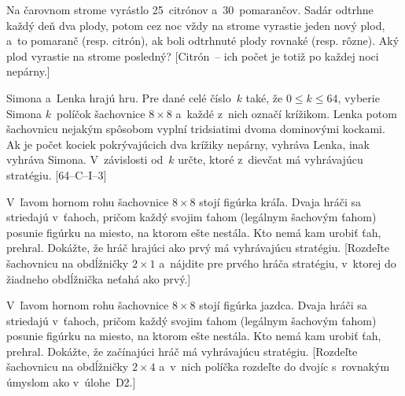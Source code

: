 {Na čarovnom strome vyrástlo 25~citrónov a~30~pomarančov. Sadár odtrhne každý
deň dva plody, potom cez noc vždy na strome vyrastie jeden nový plod,
a~to pomaranč (resp. citrón), ak boli odtrhnuté plody rovnaké (resp. rôzne).
Aký plod vyrastie na strome posledný? [Citrón~-- ich počet je
totiž po každej noci nepárny.]

\D
Simona a~Lenka hrajú hru. Pre dané celé číslo~$k$ také, že $0 \le
k\le 64$, vyberie Simona $k$~políčok šachovnice $8\times 8$ a~každé
z~nich označí krížikom. Lenka potom šachovnicu nejakým spôsobom vyplní
tridsiatimi dvoma dominovými kockami. Ak je počet kociek pokrývajúcich dva
krížiky nepárny, vyhráva Lenka, inak vyhráva Simona. V~závislosti od~$k$
určte, ktoré z~dievčat má vyhrávajúcu stratégiu.
[\hbox{64--C--I--3}]

V~ľavom hornom rohu šachovnice $8 \times 8$ stojí figúrka kráľa.
Dvaja hráči sa striedajú v~ťahoch, pričom každý svojim ťahom
(legálnym šachovým ťahom) posunie figúrku na miesto, na ktorom ešte nestála. Kto
nemá kam urobiť ťah, prehral. Dokážte, že hráč hrajúci ako prvý má vyhrávajúcu
stratégiu. [Rozdeľte šachovnicu na obdĺžničky $2\times 1$ a~nájdite pre
prvého hráča stratégiu, v~ktorej do žiadneho obdĺžnička neťahá ako prvý.]

V~ľavom hornom rohu šachovnice $8 \times 8$ stojí figúrka jazdca.
Dvaja hráči sa striedajú v~ťahoch, pričom každý svojim ťahom
(legálnym šachovým ťahom) posunie figúrku na miesto, na ktorom ešte nestála. Kto
nemá kam urobiť ťah, prehral. Dokážte, že začínajúci hráč má vyhrávajúcu
stratégiu. [Rozdeľte šachovnicu na obdĺžničky $2\times 4$ a~v~nich
políčka rozdeľte do dvojíc s~rovnakým úmyslom ako v~úlohe~D2.]
}

